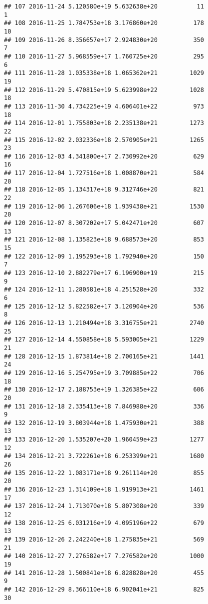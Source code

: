 \documentclass[]{article}
\begin{document}
\begin{verbatim}
## 107 2016-11-24 5.120580e+19 5.632638e+20           11               1
## 108 2016-11-25 1.784753e+18 3.176860e+20          178              10
## 109 2016-11-26 8.356657e+17 2.924830e+20          350               7
## 110 2016-11-27 5.968559e+17 1.760725e+20          295               6
## 111 2016-11-28 1.035338e+18 1.065362e+21         1029              19
## 112 2016-11-29 5.470815e+19 5.623998e+22         1028              18
## 113 2016-11-30 4.734225e+19 4.606401e+22          973              18
## 114 2016-12-01 1.755803e+18 2.235138e+21         1273              22
## 115 2016-12-02 2.032336e+18 2.570905e+21         1265              23
## 116 2016-12-03 4.341800e+17 2.730992e+20          629              16
## 117 2016-12-04 1.727516e+18 1.008870e+21          584              20
## 118 2016-12-05 1.134317e+18 9.312746e+20          821              22
## 119 2016-12-06 1.267606e+18 1.939438e+21         1530              20
## 120 2016-12-07 8.307202e+17 5.042471e+20          607              13
## 121 2016-12-08 1.135823e+18 9.688573e+20          853              15
## 122 2016-12-09 1.195293e+18 1.792940e+20          150               7
## 123 2016-12-10 2.882279e+17 6.196900e+19          215               9
## 124 2016-12-11 1.280581e+18 4.251528e+20          332               6
## 125 2016-12-12 5.822582e+17 3.120904e+20          536               8
## 126 2016-12-13 1.210494e+18 3.316755e+21         2740              25
## 127 2016-12-14 4.550858e+18 5.593005e+21         1229              21
## 128 2016-12-15 1.873814e+18 2.700165e+21         1441              24
## 129 2016-12-16 5.254795e+19 3.709885e+22          706              18
## 130 2016-12-17 2.188753e+19 1.326385e+22          606              20
## 131 2016-12-18 2.335413e+18 7.846988e+20          336               9
## 132 2016-12-19 3.803944e+18 1.475930e+21          388              13
## 133 2016-12-20 1.535207e+20 1.960459e+23         1277              12
## 134 2016-12-21 3.722261e+18 6.253399e+21         1680              26
## 135 2016-12-22 1.083171e+18 9.261114e+20          855              20
## 136 2016-12-23 1.314109e+18 1.919913e+21         1461              17
## 137 2016-12-24 1.713070e+18 5.807308e+20          339              12
## 138 2016-12-25 6.031216e+19 4.095196e+22          679              13
## 139 2016-12-26 2.242240e+18 1.275835e+21          569              21
## 140 2016-12-27 7.276582e+17 7.276582e+20         1000              19
## 141 2016-12-28 1.500841e+18 6.828828e+20          455               9
## 142 2016-12-29 8.366110e+18 6.902041e+21          825              30

\end{verbatim}
\end{document}
